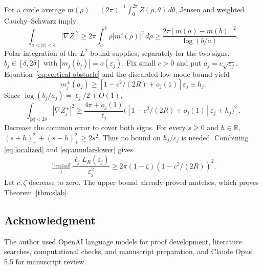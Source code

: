 \documentclass[11pt,reqno]{amsart}
\numberwithin{equation}{section}
\theoremstyle{definition}
\theoremstyle{remark}
\newcommand{\R}{\mathbb R}
\newcommand{\eps}{\varepsilon}
\begin{document}
For a circle average
$m(\rho)=(2\pi)^{-1}\int_0^{2\pi}Z(\rho,\theta)\,d\theta$,
Jensen and weighted Cauchy--Schwarz imply
\begin{equation}\label{eq:annulus}
 \int_{a<|x|<b}|\nabla Z|^2
 \ge2\pi\int_a^b\rho|m'(\rho)|^2\,d\rho
 \ge\frac{2\pi[m(a)-m(b)]^2}{\log(b/a)}.
\end{equation}
Polar integration of the $L^2$ bound supplies, separately for the two
signs, $b_j\in[\delta,2\delta]$ with $|m_j(b_j)|=o(\eps_j)$.
Fix small $c>0$ and put $a_j=c\sqrt{\eps_j}$.
Equation~\eqref{eq:vertical-obstacle} and the discarded low-mode bound
yield
\[
 m_j^\pm(a_j)\ge[1-c^2/(2R)+o_j(1)]\eps_j\pm h_j.
\]
Since $\log(b_j/a_j)=\ell_j/2+O(1)$,
\begin{equation}\label{eq:annular-lower}
 \int_{|x|<2\delta}|\nabla Z_j^\pm|^2
 \ge\frac{4\pi+o_j(1)}{\ell_j}
 \bigl([1-c^2/(2R)+o_j(1)]\eps_j\pm h_j\bigr)_+^2.
\end{equation}
Decrease the common error to cover both signs. For every $s\ge0$
and $h\in\R$, $(s+h)_+^2+(s-h)_+^2\ge2s^2$.
Thus no bound on $h_j/\eps_j$ is needed. Combining
\eqref{eq:localized} and \eqref{eq:annular-lower} gives
\[
 \liminf_j\frac{\ell_j L_R(\eps_j)}{\eps_j^2}
 \ge2\pi(1-\zeta)(1-c^2/(2R))^2.
\]
Let $c,\zeta$ decrease to zero. The upper bound already proved matches,
which proves Theorem~\ref{thm:slab}.

\subsection*{Acknowledgment}
The author used OpenAI language models for proof development, literature
searches, computational checks, and manuscript preparation, and Claude
Opus 5.5 for manuscript review.
\end{document}
